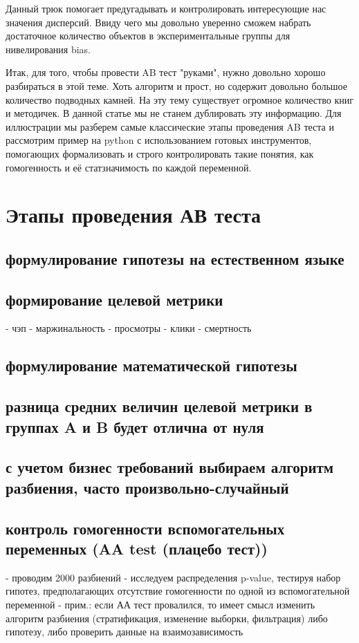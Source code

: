             Данный трюк помогает предугадывать и контролировать интересующие нас значения дисперсий. Ввиду чего мы довольно уверенно сможем набрать достаточное количество объектов в экспериментальные группы для нивелирования bias.

            Итак, для того, чтобы провести AB тест "руками", нужно довольно хорошо разбираться в этой теме. Хоть алгоритм и прост, но содержит довольно большое количество подводных камней. На эту тему существует огромное количество книг и методичек.
            В данной статье мы не станем дублировать эту информацию. Для иллюстрации мы разберем самые классические этапы проведения AB теста и рассмотрим пример на python с использованием готовых инструментов, помогающих формализовать и строго контролировать такие понятия, как гомогенность и её статзначимость по каждой переменной.

    \section{Этапы проведения АВ теста}

        \subsection{формулирование гипотезы на естественном языке}
        \subsection{формирование целевой метрики}
            - чэп
            - маржинальность
            - просмотры
            - клики
            - смертность
        \subsection{формулирование математической гипотезы}

        \subsection{разница средних величин целевой метрики в группах A и B будет отлична от нуля}

        \subsection{с учетом бизнес требований выбираем алгоритм разбиения, часто произвольно-случайный}

        \subsection{контроль гомогенности вспомогательных переменных (AA test (плацебо тест))}
        - проводим 2000 разбиений
        - исследуем распределения p-value, тестируя набор гипотез, предполагающих отсутствие гомогенности по одной из вспомогательной переменной
        - прим.: если АА тест провалился, то имеет смысл изменить алгоритм разбиения (стратификация, изменение выборки, фильтрация) либо гипотезу, либо проверить данные на взаимозависимость


